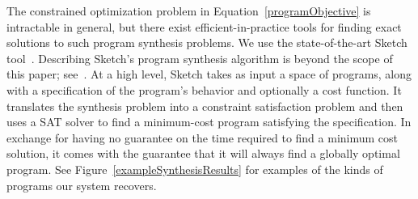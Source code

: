 \documentclass{article}
\begin{document}
The constrained optimization problem in
Equation~\ref{programObjective} is intractable in general, but there
exist efficient-in-practice tools for finding exact solutions to such
program synthesis problems. We use the state-of-the-art Sketch
tool~\cite{solar2008program}. Describing Sketch's program synthesis
algorithm is beyond the scope of this paper; see~\cite{solar2008program}.  At a
high level, Sketch takes as input a space of programs, along with a
specification of the program's behavior and optionally a cost
function.  It translates the synthesis problem into a constraint
satisfaction problem and then uses a SAT solver to find a
minimum-cost program satisfying the specification.  In exchange for
having no guarantee on the time required to find a minimum
cost solution, it comes with the guarantee that it will always find a
globally optimal program.
See Figure~\ref{exampleSynthesisResults} for examples of the kinds of programs our system recovers.

\newcommand{\exampleProgramSize}{6cm}
\newcommand{\exampleTraceSize}{4.5cm}
\newcommand{\exampleDrawingSize}{2cm}
\end{document}
